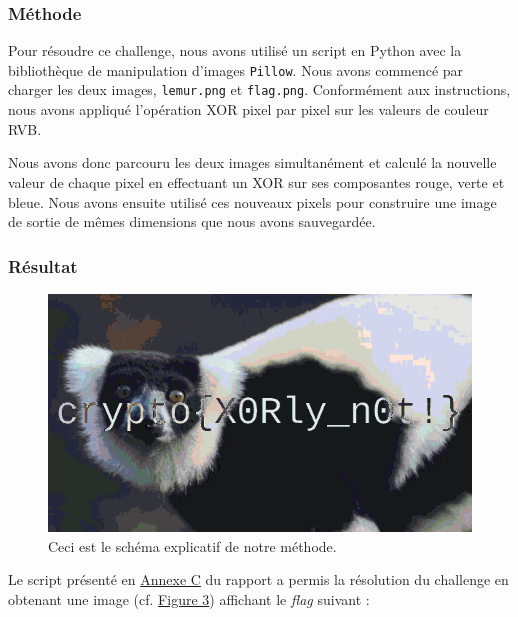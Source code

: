 \subsubsection{Méthode}
Pour résoudre ce challenge, nous avons utilisé un script en Python avec la
bibliothèque de manipulation d'images \texttt{Pillow}. Nous avons commencé
par charger les deux images, \texttt{lemur.png} et \texttt{flag.png}.
Conformément aux instructions, nous avons appliqué l'opération XOR pixel
par pixel sur les valeurs de couleur RVB.

Nous avons donc parcouru les deux images simultanément et calculé la
nouvelle valeur de chaque pixel en effectuant un XOR sur ses composantes
rouge, verte et bleue. Nous avons ensuite utilisé ces nouveaux pixels
pour construire une image de sortie de mêmes dimensions que nous avons
sauvegardée.

\subsubsection{Résultat}

\begin{figure}[H]
    \centering
    \includegraphics[width=0.8\linewidth]{Images/Lemur/xored_result.png}

    \caption{Ceci est le schéma explicatif de notre méthode.}

    \label{fig:lemurChallRes}
\end{figure}

Le script présenté en \hyperref[annexe:script-lemur]{Annexe C} du rapport a permis la résolution du challenge en obtenant
 une image (cf. \hyperref[fig:lemurChallRes]{Figure 3}) affichant le \textit{flag} suivant :

